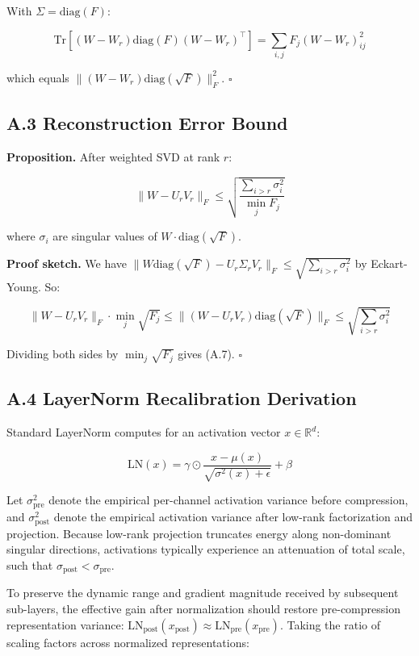 With $\Sigma = \mathrm{diag}(F)$:

\[
\mathrm{Tr}[(W - W_r) \mathrm{diag}(F) (W - W_r)^\top] = \sum_{i, j} F_j (W - W_r)_{ij}^2
\tag{A.6}
\]

which equals $\|(W - W_r) \mathrm{diag}(\sqrt{F})\|_F^2$. $\square$

\subsection{A.3 Reconstruction Error Bound}

\textbf{Proposition.} After weighted SVD at rank $r$:

\[
\|W - U_r V_r\|_F \leq \sqrt{\frac{\sum_{i > r} \sigma_i^2}{\min_j F_j}}
\tag{A.7}
\]

where $\sigma_i$ are singular values of $W \cdot \mathrm{diag}(\sqrt{F})$.

\textbf{Proof sketch.} We have $\|W \mathrm{diag}(\sqrt{F}) - U_r \Sigma_r V_r\|_F \leq \sqrt{\sum_{i > r} \sigma_i^2}$ by Eckart-Young. So:

\[
\|W - U_r V_r\|_F \cdot \min_j \sqrt{F_j} \leq \|(W - U_r V_r) \mathrm{diag}(\sqrt{F})\|_F \leq \sqrt{\sum_{i > r} \sigma_i^2}
\tag{A.8}
\]

Dividing both sides by $\min_j \sqrt{F_j}$ gives (A.7). $\square$

\subsection{A.4 LayerNorm Recalibration Derivation}

Standard LayerNorm computes for an activation vector $x \in \mathbb{R}^d$:

\[
\mathrm{LN}(x) = \gamma \odot \frac{x - \mu(x)}{\sqrt{\sigma^2(x) + \epsilon}} + \beta
\tag{A.9}
\]

Let $\sigma_{\mathrm{pre}}^2$ denote the empirical per-channel activation variance before compression, and $\sigma_{\mathrm{post}}^2$ denote the empirical activation variance after low-rank factorization and projection. Because low-rank projection truncates energy along non-dominant singular directions, activations typically experience an attenuation of total scale, such that $\sigma_{\mathrm{post}} < \sigma_{\mathrm{pre}}$.

To preserve the dynamic range and gradient magnitude received by subsequent sub-layers, the effective gain after normalization should restore pre-compression representation variance: $\mathrm{LN}_{\mathrm{post}}(x_{\mathrm{post}}) \approx \mathrm{LN}_{\mathrm{pre}}(x_{\mathrm{pre}})$. Taking the ratio of scaling factors across normalized representations:


